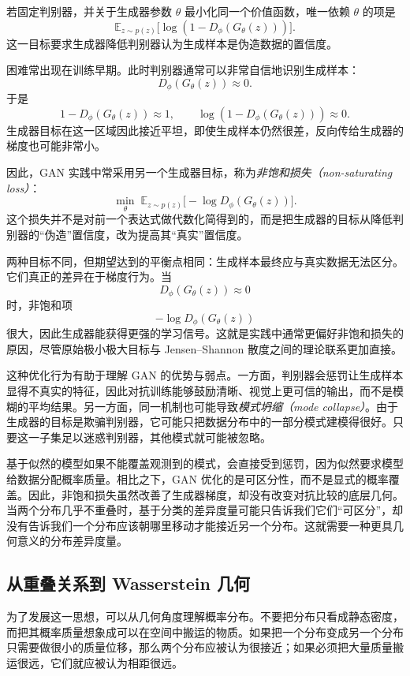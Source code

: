 若固定判别器，并关于生成器参数 $\theta$ 最小化同一个价值函数，唯一依赖 $\theta$ 的项是
\[
\mathbb{E}_{z \sim p(z)}
\big[\log (1 - D_\phi(G_\theta(z)))\big].
\]
这一目标要求生成器降低判别器认为生成样本是伪造数据的置信度。

困难常出现在训练早期。此时判别器通常可以非常自信地识别生成样本：
\[
D_\phi(G_\theta(z))\approx 0.
\]
于是
\[
1-D_\phi(G_\theta(z))\approx 1,
\qquad
\log(1-D_\phi(G_\theta(z)))\approx 0.
\]
生成器目标在这一区域因此接近平坦，即使生成样本仍然很差，反向传给生成器的梯度也可能非常小。

因此，GAN 实践中常采用另一个生成器目标，称为\emph{非饱和损失（non-saturating loss）}：
\[
\min_\theta
\;
\mathbb{E}_{z \sim p(z)}
\big[
-\log D_\phi(G_\theta(z))
\big].
\]
这个损失并不是对前一个表达式做代数化简得到的，而是把生成器的目标从降低判别器的“伪造”置信度，改为提高其“真实”置信度。

两种目标不同，但期望达到的平衡点相同：生成样本最终应与真实数据无法区分。它们真正的差异在于梯度行为。当
\[
D_\phi(G_\theta(z))\approx 0
\]
时，非饱和项
\[
-\log D_\phi(G_\theta(z))
\]
很大，因此生成器能获得更强的学习信号。这就是实践中通常更偏好非饱和损失的原因，尽管原始极小极大目标与 Jensen--Shannon 散度之间的理论联系更加直接。

这种优化行为有助于理解 GAN 的优势与弱点。一方面，判别器会惩罚让生成样本显得不真实的特征，因此对抗训练能够鼓励清晰、视觉上更可信的输出，而不是模糊的平均结果。另一方面，同一机制也可能导致\emph{模式坍缩（mode collapse）}。由于生成器的目标是欺骗判别器，它可能只把数据分布中的一部分模式建模得很好。只要这一子集足以迷惑判别器，其他模式就可能被忽略。

基于似然的模型如果不能覆盖观测到的模式，会直接受到惩罚，因为似然要求模型给数据分配概率质量。相比之下，GAN 优化的是可区分性，而不是显式的概率覆盖。因此，非饱和损失虽然改善了生成器梯度，却没有改变对抗比较的底层几何。当两个分布几乎不重叠时，基于分类的差异度量可能只告诉我们它们“可区分”，却没有告诉我们一个分布应该朝哪里移动才能接近另一个分布。这就需要一种更具几何意义的分布差异度量。

\subsection{从重叠关系到 Wasserstein 几何}

为了发展这一思想，可以从几何角度理解概率分布。不要把分布只看成静态密度，而把其概率质量想象成可以在空间中搬运的物质。如果把一个分布变成另一个分布只需要做很小的质量位移，那么两个分布应被认为很接近；如果必须把大量质量搬运很远，它们就应被认为相距很远。

